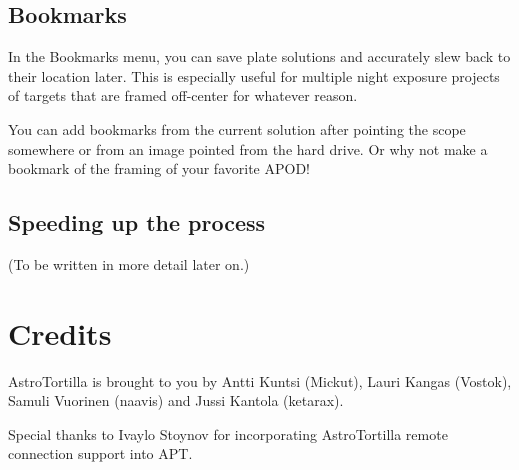 \documentclass[english]{article}
\begin{document}
\subsection{Bookmarks}

In the Bookmarks menu, you can save plate solutions and accurately slew back to their location later. 
This is especially useful for multiple night exposure projects of targets that are framed off-center for whatever reason.

You can add bookmarks from the current solution after pointing the scope somewhere or from an image pointed from the hard drive. Or why not make a bookmark of the framing of your favorite APOD!

\subsection{Speeding up the process}

(To be written in more detail later on.)

\section{Credits}

AstroTortilla is brought to you by Antti Kuntsi (Mickut), Lauri Kangas (Vostok), Samuli Vuorinen (naavis) and Jussi Kantola (ketarax). 

Special thanks to Ivaylo Stoynov for incorporating AstroTortilla remote connection support into APT.

\end{document}
